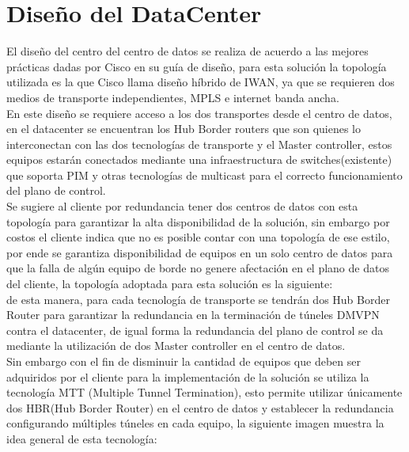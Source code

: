 \chapter{Diseño del DataCenter}
\label{cha:Diseño del DataCenter}

El diseño del centro del centro de datos se realiza de acuerdo a las mejores prácticas dadas por Cisco en su guía de diseño, para esta solución la topología utilizada es la que Cisco llama diseño híbrido de IWAN, ya que se requieren dos medios de transporte independientes, MPLS e internet banda ancha.
\\
En este diseño se requiere acceso a los dos transportes desde el centro de datos, en el datacenter se encuentran los Hub Border routers que son quienes lo interconectan con las dos tecnologías de transporte y el Master controller, estos equipos estarán conectados mediante una infraestructura de switches(existente) que soporta PIM y otras tecnologías de multicast para el correcto funcionamiento del plano de control.
\\
Se sugiere al cliente por redundancia tener dos centros de datos con esta topología para garantizar la alta disponibilidad de la solución, sin embargo por costos el cliente indica que no es posible contar con una topología de ese estilo, por ende se garantiza disponibilidad de equipos en un solo centro de datos para que la falla de algún equipo de borde no genere afectación en el plano de datos del cliente, la topología adoptada para esta solución es la siguiente:
\\
de esta manera, para cada tecnología de transporte se tendrán dos Hub Border Router para garantizar la redundancia en la terminación de túneles DMVPN contra el datacenter, de igual forma la redundancia del plano de control se da mediante la utilización de dos Master controller en el centro de datos.
\\
Sin embargo con el fin de disminuir la cantidad de equipos que deben ser adquiridos por el cliente para la implementación de la solución se utiliza la tecnología MTT (Multiple Tunnel Termination), esto permite utilizar únicamente dos HBR(Hub Border Router) en el centro de datos y establecer la redundancia configurando múltiples túneles en cada equipo, la siguiente imagen muestra la idea general de esta tecnología:
\\
